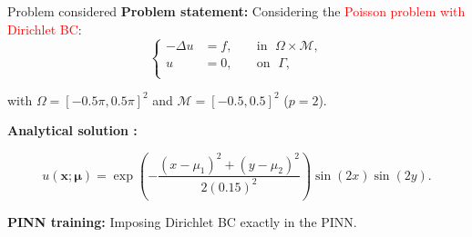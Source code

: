 \begin{frame}{Problem considered} 
	\textbf{Problem statement:} Considering the \textcolor{red}{Poisson problem with Dirichlet BC}:
	\vspace{-5pt}
	\begin{equation*}
		\left\{
		\begin{aligned}
			-\Delta u & = f, \; &  & \text{in } \; \Omega \times \mathcal{M}, \\
			u         & = 0, \;  &  & \text{on } \; \Gamma, \\
		\end{aligned}
		\right.
	\end{equation*}

	with $\Omega=[-0.5\pi,0.5\pi]^2$ and $\mathcal{M}=[-0.5,0.5]^2$ ($p=2$).
	
	\vspace{2pt}
	\textbf{Analytical solution :}

	\vspace{-12pt}
	\begin{equation*}
		u(\bm{x};\bm{\mu})= \exp\left(-\frac{(x-\mu_1)^2+(y-\mu_2)^2}{2(0.15)^2}\right)\sin(2x)\sin(2y).
	\end{equation*}

	\vspace{2pt}
	\small
	\textbf{PINN training:} Imposing Dirichlet BC exactly in the PINN.

	\vspace{8pt}
\end{frame}

